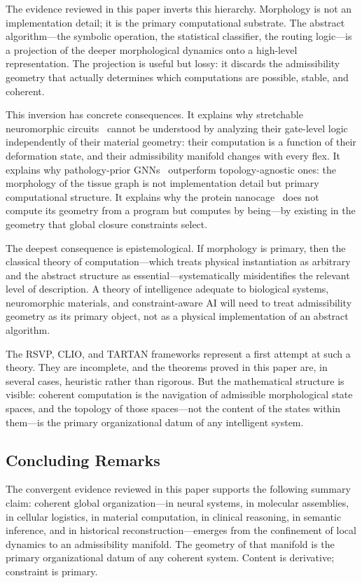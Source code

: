 \documentclass[11pt, oneside]{article}
\numberwithin{equation}{section}
\theoremstyle{rsvpstyle}
\theoremstyle{remark}
\begin{document}
The evidence reviewed in this paper inverts this hierarchy. Morphology is not an
implementation detail; it is the primary computational substrate. The abstract
algorithm---the symbolic operation, the statistical classifier, the routing
logic---is a projection of the deeper morphological dynamics onto a high-level
representation. The projection is useful but lossy: it discards the admissibility
geometry that actually determines which computations are possible, stable, and coherent.

This inversion has concrete consequences. It explains why stretchable neuromorphic
circuits~\cite{Li2026Stretchable} cannot be understood by analyzing their gate-level
logic independently of their material geometry: their computation is a function of
their deformation state, and their admissibility manifold changes with every flex.
It explains why pathology-prior GNNs~\cite{Wu2026GNN} outperform topology-agnostic
ones: the morphology of the tissue graph is not implementation detail but primary
computational structure. It explains why the protein nanocage~\cite{Lee2026Nanocages}
does not compute its geometry from a program but computes by being---by existing
in the geometry that global closure constraints select.

The deepest consequence is epistemological. If morphology is primary, then the
classical theory of computation---which treats physical instantiation as arbitrary and
the abstract structure as essential---systematically misidentifies the relevant level
of description. A theory of intelligence adequate to biological systems, neuromorphic
materials, and constraint-aware AI will need to treat admissibility geometry as its
primary object, not as a physical implementation of an abstract algorithm.

The RSVP, CLIO, and TARTAN frameworks represent a first attempt at such a theory.
They are incomplete, and the theorems proved in this paper are, in several cases,
heuristic rather than rigorous. But the mathematical structure is visible: coherent
computation is the navigation of admissible morphological state spaces, and the
topology of those spaces---not the content of the states within them---is the primary
organizational datum of any intelligent system.

\subsection{Concluding Remarks}

The convergent evidence reviewed in this paper supports the following summary claim:
coherent global organization---in neural systems, in molecular assemblies, in cellular
logistics, in material computation, in clinical reasoning, in semantic inference, and
in historical reconstruction---emerges from the confinement of local dynamics to an
admissibility manifold. The geometry of that manifold is the primary organizational
datum of any coherent system. Content is derivative; constraint is primary.
\end{document}

